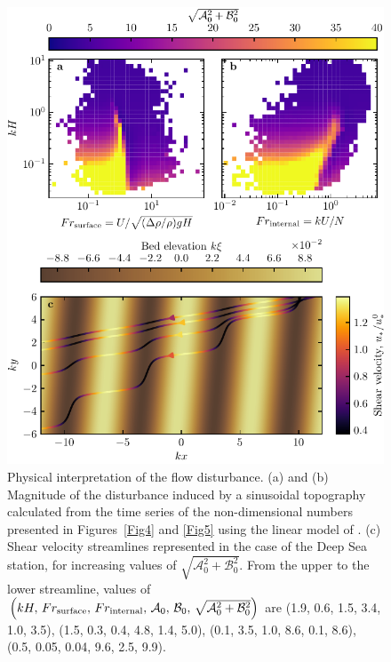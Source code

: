 \begin{figure}
  \centering
  \includegraphics[scale=1]{Figures/Figure13_supp.pdf}
  \caption{Physical interpretation of the flow disturbance. (a) and (b) Magnitude of the disturbance induced by a sinusoidal topography calculated from the time series of the non-dimensional numbers presented in Figures~\ref{Fig4} and \ref{Fig5} using the linear model of \citet{andreotti2009}. (c) Shear velocity streamlines represented in the case of the Deep Sea station, for increasing values of $\sqrt{\mathcal{A}_{0}^{2} + \mathcal{B}_{0}^{2}}$. From the upper to the lower streamline, values of $\left(kH,\, Fr_{\textup{surface}},\, Fr_{\textup{internal}},\, \mathcal{A}_{0},\, \mathcal{B}_{0},\, \sqrt{\mathcal{A}_{0}^{2} + \mathcal{B}_{0}^{2}}\right)$ are (1.9, 0.6, 1.5, 3.4, 1.0, 3.5), (1.5, 0.3, 0.4, 4.8, 1.4, 5.0), (0.1, 3.5, 1.0, 8.6, 0.1, 8.6), (0.5, 0.05, 0.04, 9.6, 2.5, 9.9).}
  \label{Fig13_supp}
\end{figure}




